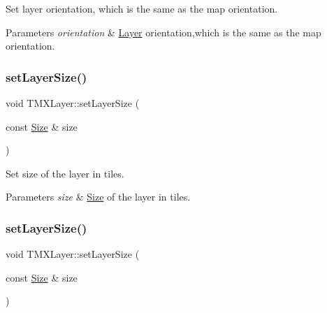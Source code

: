 Set layer orientation, which is the same as the map orientation.


\begin{DoxyParams}{Parameters}
{\em orientation} & \hyperlink{classLayer}{Layer} orientation,which is the same as the map orientation. \\
\hline
\end{DoxyParams}
\mbox{\label{classTMXLayer_a4967459155b855cfa403d2fbb4b6f7c1}} 
\subsubsection{\texorpdfstring{set\+Layer\+Size()}{setLayerSize()}\hspace{0.1cm}{\footnotesize\ttfamily [1/2]}}
{\footnotesize\ttfamily void T\+M\+X\+Layer\+::set\+Layer\+Size (\begin{DoxyParamCaption}\item[{const \hyperlink{classSize}{Size} \&}]{size }\end{DoxyParamCaption})\hspace{0.3cm}{\ttfamily [inline]}}

Set size of the layer in tiles.


\begin{DoxyParams}{Parameters}
{\em size} & \hyperlink{classSize}{Size} of the layer in tiles. \\
\hline
\end{DoxyParams}
\mbox{\label{classTMXLayer_a4967459155b855cfa403d2fbb4b6f7c1}} 
\subsubsection{\texorpdfstring{set\+Layer\+Size()}{setLayerSize()}\hspace{0.1cm}{\footnotesize\ttfamily [2/2]}}
{\footnotesize\ttfamily void T\+M\+X\+Layer\+::set\+Layer\+Size (\begin{DoxyParamCaption}\item[{const \hyperlink{classSize}{Size} \&}]{size }\end{DoxyParamCaption})\hspace{0.3cm}{\ttfamily [inline]}}

